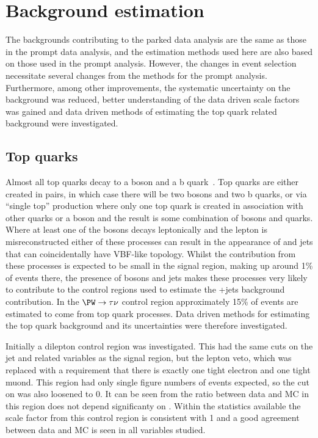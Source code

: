 \section{Background estimation}%
\label{sec:parkedbkg}
The backgrounds contributing to the parked data analysis are the same as those in the prompt data analysis, and the estimation methods used here are also based on those used in the prompt analysis. However, the changes in event selection necessitate several changes from the methods for the prompt analysis. Furthermore, among other improvements, the systematic uncertainty on the \Znunu background was reduced, better understanding of the data driven scale factors was gained and data driven methods of estimating the top quark related background were investigated.

\subsection{Top quarks}%
Almost all top quarks decay to a \PW boson and a b quark~\cite{pdg}. Top quarks are either created in pairs, in which case there will be two \PW bosons and two b quarks, or via ``single top'' production where only one top quark is created in association with other quarks or a \PW boson and the result is some combination of \PW bosons and quarks. Where at least one of the \PW bosons decays leptonically and the lepton is misreconstructed either of these processes can result in the appearance of \MET and jets that can coincidentally have \ac{VBF}-like topology. Whilst the contribution from these processes is expected to be small in the signal region, making up around 1\% of events there, the presence of \PW bosons and jets makes these processes very likely to contribute to the control regions used to estimate the \PW+jets background contribution. In the $\PW\rightarrow\tau\nu$ control region approximately 15\% of events are estimated to come from top quark processes. Data driven methods for estimating the top quark background and its uncertainties were therefore investigated.

Initially a dilepton control region was investigated. This had the same cuts on the jet and \MET related variables as the signal region, but the lepton veto, which was replaced with a requirement that there is exactly one tight electron and one tight muond. This region had only single figure numbers of events expected, so the cut on \jetmetdphi was also loosened to 0. It can be seen from  the ratio between data and MC in this region does not depend significanty on \jetmetdphi. Within the statistics available the scale factor from this control region is consistent with 1 and a good agreement between data and \ac{MC} is seen in all variables studied.

